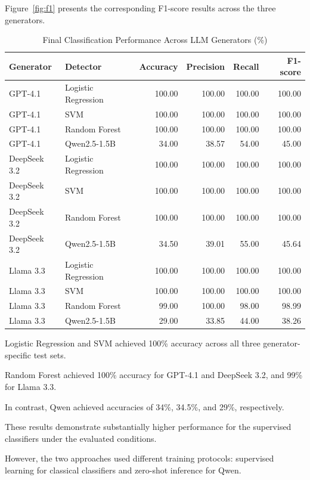 \documentclass[sigconf,nonacm]{acmart}
\begin{document}
Figure~\ref{fig:f1} presents the corresponding
F1-score results across the three generators.
\begin{table}[t]
\centering
\caption{Final Classification Performance
Across LLM Generators (\%)}
\label{tab:final_results}
\small
\begin{tabular}{llrrrr}
\toprule
Generator & Detector & Accuracy &
Precision & Recall & F1-score \\
\midrule
GPT-4.1 & Logistic Regression &
100.00 & 100.00 & 100.00 & 100.00 \\
GPT-4.1 & SVM &
100.00 & 100.00 & 100.00 & 100.00 \\
GPT-4.1 & Random Forest &
100.00 & 100.00 & 100.00 & 100.00 \\
GPT-4.1 & Qwen2.5-1.5B &
34.00 & 38.57 & 54.00 & 45.00 \\
\midrule
DeepSeek 3.2 & Logistic Regression &
100.00 & 100.00 & 100.00 & 100.00 \\
DeepSeek 3.2 & SVM &
100.00 & 100.00 & 100.00 & 100.00 \\
DeepSeek 3.2 & Random Forest &
100.00 & 100.00 & 100.00 & 100.00 \\
DeepSeek 3.2 & Qwen2.5-1.5B &
34.50 & 39.01 & 55.00 & 45.64 \\
\midrule
Llama 3.3 & Logistic Regression &
100.00 & 100.00 & 100.00 & 100.00 \\
Llama 3.3 & SVM &
100.00 & 100.00 & 100.00 & 100.00 \\
Llama 3.3 & Random Forest &
99.00 & 100.00 & 98.00 & 98.99 \\
Llama 3.3 & Qwen2.5-1.5B &
29.00 & 33.85 & 44.00 & 38.26 \\
\bottomrule
\end{tabular}
\end{table}

Logistic Regression and SVM achieved
100\% accuracy across all three
generator-specific test sets.

Random Forest achieved 100\% accuracy
for GPT-4.1 and DeepSeek 3.2,
and 99\% for Llama 3.3.

In contrast, Qwen achieved accuracies
of 34\%, 34.5\%, and 29\%, respectively.

These results demonstrate substantially
higher performance for the supervised
classifiers under the evaluated conditions.

However, the two approaches used different
training protocols: supervised learning
for classical classifiers and zero-shot
inference for Qwen.
\end{document}

